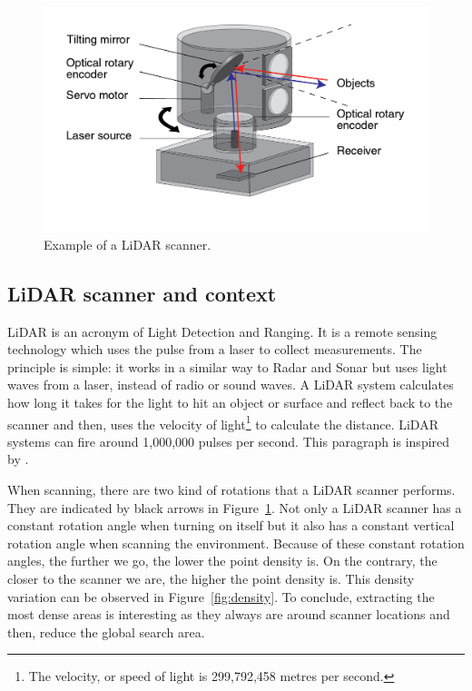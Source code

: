 \begin{figure}
  \centering
  \includegraphics[scale=1]{img/lidar.jpg}
  \caption{Example of a LiDAR scanner.}
  \label{fig:lidar}
\end{figure}


\subsection{LiDAR scanner and context}
\label{subsc:lidar}
LiDAR is an acronym of Light Detection and Ranging. It is a remote sensing technology which uses the pulse from a laser to collect measurements. The principle is simple: it works in a similar way to Radar and Sonar but uses light waves from a laser, instead of radio or sound waves. A LiDAR system calculates how long it takes for the light to hit an object or surface and reflect back to the scanner and then, uses the velocity of light\footnote{The velocity, or speed of light is 299,792,458 metres
per second.} to calculate the distance. LiDAR systems can fire around 1,000,000 pulses per second. This paragraph is inspired by \cite{lidar}.

When scanning, there are two kind of rotations that a LiDAR scanner performs. They are indicated by black arrows in Figure~\ref{fig:lidar}. Not only a LiDAR scanner has a constant rotation angle when turning on itself but it also has a constant vertical rotation angle when scanning the environment. Because of these constant rotation angles, the further we go, the lower the point density is. On the contrary, the closer to the scanner we are, the higher the point density is. This density variation can be observed in
Figure~\ref{fig:density}. To conclude, extracting the most dense areas is interesting as they always are around scanner locations and then, reduce the global search area.

